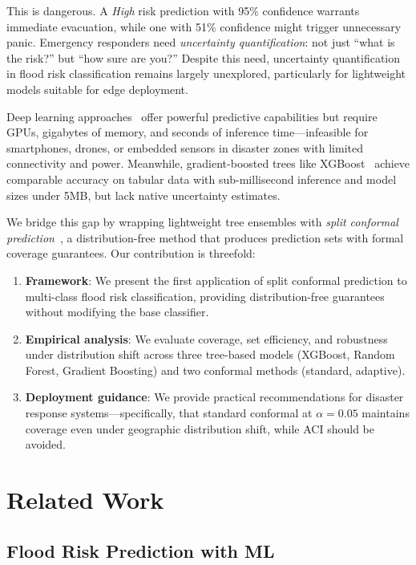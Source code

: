 \documentclass{article}
\begin{document}
This is dangerous. A \textit{High} risk prediction with 95\% confidence warrants immediate evacuation, while one with 51\% confidence might trigger unnecessary panic. Emergency responders need \textit{uncertainty quantification}: not just ``what is the risk?'' but ``how sure are you?'' Despite this need, uncertainty quantification in flood risk classification remains largely unexplored, particularly for lightweight models suitable for edge deployment.

Deep learning approaches~\cite{flooddan2022, gnn_flood2026} offer powerful predictive capabilities but require GPUs, gigabytes of memory, and seconds of inference time---infeasible for smartphones, drones, or embedded sensors in disaster zones with limited connectivity and power. Meanwhile, gradient-boosted trees like XGBoost~\cite{xgboost2016} achieve comparable accuracy on tabular data with sub-millisecond inference and model sizes under 5MB, but lack native uncertainty estimates.

We bridge this gap by wrapping lightweight tree ensembles with \textit{split conformal prediction}~\cite{split_conformal2018}, a distribution-free method that produces prediction sets with formal coverage guarantees. Our contribution is threefold:

\begin{enumerate}
    \item \textbf{Framework}: We present the first application of split conformal prediction to multi-class flood risk classification, providing distribution-free guarantees without modifying the base classifier.
    \item \textbf{Empirical analysis}: We evaluate coverage, set efficiency, and robustness under distribution shift across three tree-based models (XGBoost, Random Forest, Gradient Boosting) and two conformal methods (standard, adaptive).
    \item \textbf{Deployment guidance}: We provide practical recommendations for disaster response systems---specifically, that standard conformal at $\alpha=0.05$ maintains coverage even under geographic distribution shift, while ACI should be avoided.
\end{enumerate}

\section{Related Work}

\subsection{Flood Risk Prediction with ML}
\end{document}
